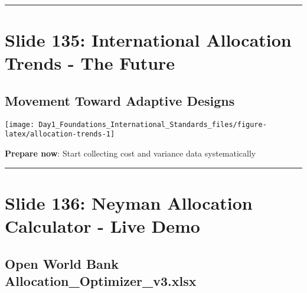 \documentclass[
]{article}
\begin{document}
\begin{center}\rule{0.5\linewidth}{0.5pt}\end{center}

\section{Slide 135: International Allocation Trends - The
Future}\label{slide-135-international-allocation-trends---the-future}

\subsection{Movement Toward Adaptive
Designs}\label{movement-toward-adaptive-designs}

\texttt{[image: Day1\_Foundations\_International\_Standards\_files/figure-latex/allocation-trends-1]}

\textbf{Prepare now}: Start collecting cost and variance data
systematically

\begin{center}\rule{0.5\linewidth}{0.5pt}\end{center}

\section{Slide 136: Neyman Allocation Calculator - Live
Demo}\label{slide-136-neyman-allocation-calculator---live-demo}

\subsection{Open World Bank
Allocation\_Optimizer\_v3.xlsx}\label{open-world-bank-allocation_optimizer_v3.xlsx}
\end{document}
